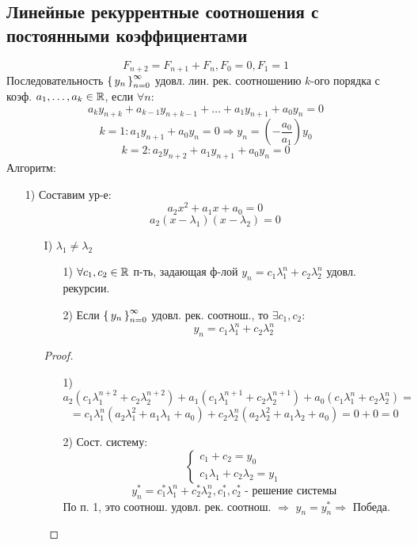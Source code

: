 \subsection{Линейные рекуррентные соотношения с постоянными коэффициентами}
\[
F_{n + 2} = F_{n + 1} + F_n, F_0 = 0, F_1 = 1
\]
Последовательность $\set{y_n}_{n = 0}^{\infty}$ удовл. лин. рек. соотношению $k$-ого порядка с коэф. $a_1, \ldots, a_k \in \mathbb{R}$, если $\forall n$:
\[
  a_ky_{n + k} + a_{k - 1}y_{n + k - 1} + \ldots + a_1 y_{n + 1} + a_0 y_n = 0
\]
\[
  k = 1\colon a_1 y_{n + 1} + a_0 y_n = 0 \Rightarrow y_n = \left(-\frac{a_0}{a_1}\right) y_0
\]
\[
  k = 2\colon a_2y_{n + 2} + a_1 y_{n + 1} + a_0 y_n = 0
\]
Алгоритм:
\begin{itemize}
  \item [1) ] Составим ур-е:
    \[
    a_2x^{2} + a_1x + a_0 = 0
    \]
    \[
    a_2(x - \lambda_1)(x - \lambda_2) = 0
    \]
    \begin{itemize}
      \item [I)] $\lambda_1 \neq \lambda_2$
    \begin{theorem}
    \begin{itemize}
      \item [1) ] $\forall c_1, c_2 \in \mathbb{R}$ п-ть, задающая ф-лой $y_n = c_1\lambda_1^{n} + c_2\lambda_2^{n}$ удовл. рекурсии.
      \item [2) ] Если $\set{y_n}_{n = 0}^{\infty}$ удовл. рек. соотнош., то $\exists c_1, c_2\colon$
        \[
        y_n = c_1\lambda_1^{n} + c_2\lambda_2^{n}
        \]
    \end{itemize}
    \end{theorem}
    \begin{proof}
    \begin{itemize}
      \item [1) ] \[
      a_2(c_1\lambda_1^{n + 2} + c_2\lambda_2^{n + 2}) + a_1(c_1\lambda_1^{n + 1} + c_2\lambda_2^{n + 1}) + a_0(c_1\lambda_1^{n} + c_2\lambda_2^{n}) = 
      \]
      \[
      = c_1\lambda_1^{n}(a_2\lambda_1^{2} + a_1\lambda_1 + a_0) + c_2\lambda_2^{n}(a_2\lambda_2^{2} + a_1\lambda_2 + a_0) = 0 + 0 = 0
      \]
    \item [2) ] Сост. систему:
      \[
      \begin{cases}
      c_1 + c_2 = y_0 \\
      c_1\lambda_1 + c_2\lambda_2 = y_1
      \end{cases}
      \]
      \[
      y_n^{*} = c_1^{*} \lambda_1^{n} + c_2^{*} \lambda_2^{n}, c_1^{*}, c_2^{*} \text{ - решение системы}
      \]
      По п. 1, это соотнош. удовл. рек. соотнош. $\Rightarrow$ $y_n = y_n^{*} \Rightarrow$ Победа. 
    \end{itemize}
    \end{proof}
    \end{itemize}
\end{itemize}
